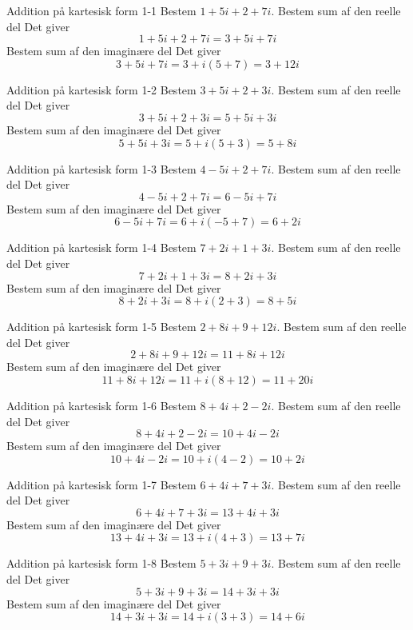 \documentclass{article}
\begin{document}
\tableofcontents
\newpage
\begin{exercise}{Addition på kartesisk form 1-1}
Bestem $1 + 5i + 2 + 7i$.
\hint
Bestem sum af den reelle del
\hint
Det giver
\[1 + 5i + 2 + 7i = 3 + 5i + 7i
\]
\hint
Bestem sum af den imaginære del
\hint
Det giver
\[3 + 5i + 7i = 3 + i(5 + 7) = 3 + 12i
\]
\end{exercise}
\newpage
\begin{exercise}{Addition på kartesisk form 1-2}
Bestem $3 + 5i + 2 + 3i$.
\hint
Bestem sum af den reelle del
\hint
Det giver
\[3 + 5i + 2 + 3i = 5 + 5i + 3i
\]
\hint
Bestem sum af den imaginære del
\hint
Det giver
\[5 + 5i + 3i = 5 + i(5 + 3) = 5 + 8i
\]
\end{exercise}
\newpage
\begin{exercise}{Addition på kartesisk form 1-3}
Bestem $4 - 5i + 2 + 7i$.
\hint
Bestem sum af den reelle del
\hint
Det giver
\[4 - 5i + 2 + 7i = 6 - 5i + 7i
\]
\hint
Bestem sum af den imaginære del
\hint
Det giver
\[6 - 5i + 7i = 6 + i(-5 + 7) = 6 + 2i
\]
\end{exercise}
\newpage
\begin{exercise}{Addition på kartesisk form 1-4}
Bestem $7 + 2i + 1 + 3i$.
\hint
Bestem sum af den reelle del
\hint
Det giver
\[7 + 2i + 1 + 3i = 8 + 2i + 3i
\]
\hint
Bestem sum af den imaginære del
\hint
Det giver
\[8 + 2i + 3i = 8 + i(2 + 3) = 8 + 5i
\]
\end{exercise}
\newpage
\begin{exercise}{Addition på kartesisk form 1-5}
Bestem $2 + 8i + 9 + 12i$.
\hint
Bestem sum af den reelle del
\hint
Det giver
\[2 + 8i + 9 + 12i = 11 + 8i + 12i
\]
\hint
Bestem sum af den imaginære del
\hint
Det giver
\[11 + 8i + 12i = 11 + i(8 + 12) = 11 + 20i
\]
\end{exercise}
\newpage
\begin{exercise}{Addition på kartesisk form 1-6}
Bestem $8 + 4i + 2 - 2i$.
\hint
Bestem sum af den reelle del
\hint
Det giver
\[8 + 4i + 2 - 2i = 10 + 4i - 2i
\]
\hint
Bestem sum af den imaginære del
\hint
Det giver
\[10 + 4i - 2i = 10 + i(4 - 2) = 10 + 2i
\]
\end{exercise}
\newpage
\begin{exercise}{Addition på kartesisk form 1-7}
Bestem $6 + 4i + 7 + 3i$.
\hint
Bestem sum af den reelle del
\hint
Det giver
\[6 + 4i + 7 + 3i = 13 + 4i + 3i
\]
\hint
Bestem sum af den imaginære del
\hint
Det giver
\[13 + 4i + 3i = 13 + i(4 + 3) = 13 + 7i
\]
\end{exercise}
\newpage
\begin{exercise}{Addition på kartesisk form 1-8}
Bestem $5 + 3i + 9 + 3i$.
\hint
Bestem sum af den reelle del
\hint
Det giver
\[5 + 3i + 9 + 3i = 14 + 3i + 3i
\]
\hint
Bestem sum af den imaginære del
\hint
Det giver
\[14 + 3i + 3i = 14 + i(3 + 3) = 14 + 6i
\]
\end{exercise}
\end{document}
